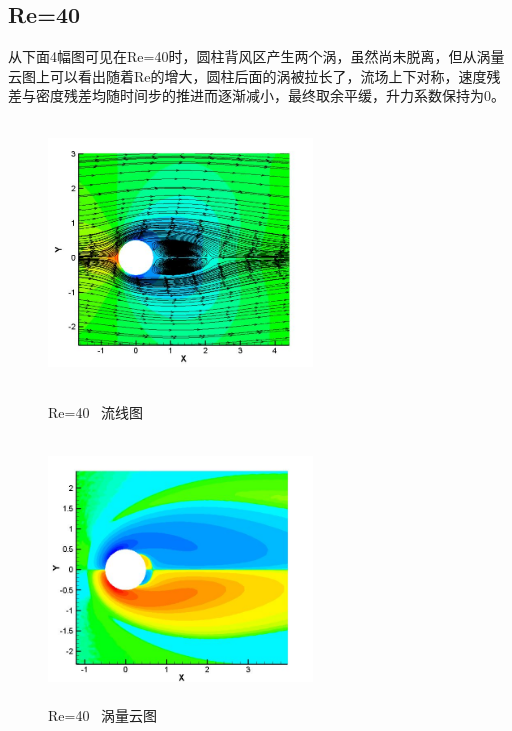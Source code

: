 \documentclass[UTF8]{ctexart}
\begin{document}
\subsection{Re=40}
从下面4幅图可见在Re=40时，圆柱背风区产生两个涡，虽然尚未脱离，但从涡量云图上可以看出随着Re的增大，圆柱后面的涡被拉长了，流场上下对称，速度残差与密度残差均随时间步的推进而逐渐减小，最终取余平缓，升力系数保持为0。
\begin{figure}[htbp]\centering
\begin{minipage}{7cm}
\includegraphics[height=7cm,width=7cm]{../pic/Streamline_40.JPG}
\caption{Re=40 \ 流线图}
\end{minipage}
\begin{minipage}{7cm}
\includegraphics[height=7cm,width=7cm]{../pic/Vorticity_40.JPG}
\caption{Re=40 \ 涡量云图}
\end{minipage}


\end{figure}
\end{document}
